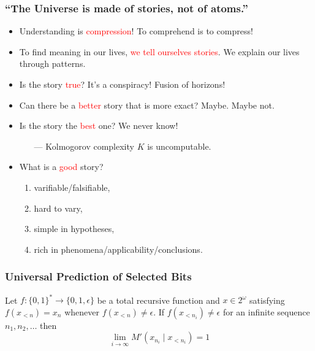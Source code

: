\documentclass[UTF8,11pt,colorlinks,compress,openany]{beamer}%
\begin{document}
\begin{frame}\frametitle{``The Universe is made of stories, not of atoms.''}
\begin{itemize}
	\item Understanding is \textcolor{red}{compression}! To comprehend is to compress!
	\item To find meaning in our lives, \textcolor{red}{we tell ourselves stories}. We explain our lives through patterns.
	\item Is the story \textcolor{red}{true}? It's a conspiracy! Fusion of horizons!
	\item Can there be a \textcolor{red}{better} story that is more exact? Maybe. Maybe not.
	\item Is the story the \textcolor{red}{best} one? We never know!\\
	\begin{itemize}
		\item[---] Kolmogorov complexity $K$ is uncomputable.
	\end{itemize}
	\item What is a \textcolor{red}{good} story?
\begin{enumerate}
	\item varifiable/falsifiable,
	\item hard to vary,
	\item simple in hypotheses,
	\item rich in phenomena/applicability/conclusions.
\end{enumerate}
\end{itemize}
\end{frame}

\begin{frame}\frametitle{Universal Prediction of Selected Bits}
	\begin{theorem}
		Let $f:\{0,1\}^*\to\{0,1,\epsilon\}$ be a total recursive function and $x\in 2^\omega$ satisfying $f(x_{<n})=x_n$ whenever $f(x_{<n})\neq\epsilon$. If $f(x_{<n_i})\neq\epsilon$ for an infinite sequence $n_1,n_2,\dots$ then
		\[\lim\limits_{i\to\infty}M'(x_{n_i}\mid x_{<n_i})=1\]
	\end{theorem}
\end{frame}
\end{document}
